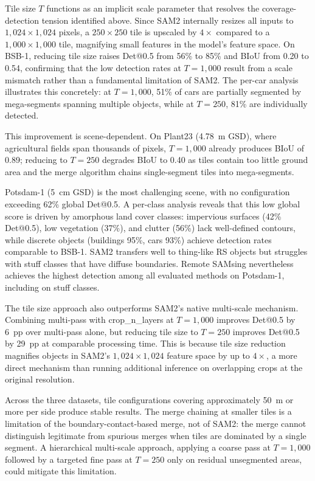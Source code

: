 \documentclass[review,11pt,authoryear]{elsarticle}
\begin{document}
Tile size $T$ functions as an implicit scale parameter that resolves the coverage-detection tension identified above. Since SAM2 internally resizes all inputs to $1{,}024 \times 1{,}024$ pixels, a $250 \times 250$ tile is upscaled by $4\times$ compared to a $1{,}000 \times 1{,}000$ tile, magnifying small features in the model's feature space. On BSB-1, reducing tile size raises Det@0.5 from 56\% to 85\% and BIoU from 0.20 to 0.54, confirming that the low detection rates at $T = 1{,}000$ result from a scale mismatch rather than a fundamental limitation of SAM2. The per-car analysis illustrates this concretely: at $T = 1{,}000$, 51\% of cars are partially segmented by mega-segments spanning multiple objects, while at $T = 250$, 81\% are individually detected.

This improvement is scene-dependent. On Plant23 (4.78~m GSD), where agricultural fields span thousands of pixels, $T = 1{,}000$ already produces BIoU of 0.89; reducing to $T = 250$ degrades BIoU to 0.40 as tiles contain too little ground area and the merge algorithm chains single-segment tiles into mega-segments.

Potsdam-1 (5~cm GSD) is the most challenging scene, with no configuration exceeding 62\% global Det@0.5. A per-class analysis reveals that this low global score is driven by amorphous land cover classes: impervious surfaces (42\% Det@0.5), low vegetation (37\%), and clutter (56\%) lack well-defined contours, while discrete objects (buildings 95\%, cars 93\%) achieve detection rates comparable to BSB-1. SAM2 transfers well to thing-like RS objects but struggles with stuff classes that have diffuse boundaries. Remote SAMsing nevertheless achieves the highest detection among all evaluated methods on Potsdam-1, including on stuff classes.

The tile size approach also outperforms SAM2's native multi-scale mechanism. Combining multi-pass with crop\_n\_layers at $T = 1{,}000$ improves Det@0.5 by 6~pp over multi-pass alone, but reducing tile size to $T = 250$ improves Det@0.5 by 29~pp at comparable processing time. This is because tile size reduction magnifies objects in SAM2's $1{,}024 \times 1{,}024$ feature space by up to $4\times$, a more direct mechanism than running additional inference on overlapping crops at the original resolution.

Across the three datasets, tile configurations covering approximately 50~m or more per side produce stable results. The merge chaining at smaller tiles is a limitation of the boundary-contact-based merge, not of SAM2: the merge cannot distinguish legitimate from spurious merges when tiles are dominated by a single segment. A hierarchical multi-scale approach, applying a coarse pass at $T = 1{,}000$ followed by a targeted fine pass at $T = 250$ only on residual unsegmented areas, could mitigate this limitation.
\end{document}
